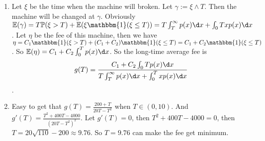\documentclass[../main]{subfiles}
\begin{document}
\begin{solution}
  \begin{enumerate}
    \item Let \(\xi\) be the time when the machine will broken. Let \(\gamma:=\xi \wedge T\).
      Then the machine will be changed at \(\gamma\).
      Obviously \(\mathbb{E}(\gamma)=T \mathbb{P}(\xi>T)+\mathbb{E}(\xi \mathbbm{1}(\xi \leq T))=T \int_{T}^{\infty}p(x) \d x + \int_{0}T xp(x) \d x\).
      Let \(\eta\) be the fee of this machine, then we have \(\eta=C_1\mathbbm{1}(\xi>T)+(C_1+C_2)\mathbbm{1}(\xi \leq T)=C_1+C_2 \mathbbm{1}(\xi \leq T)\).
      So \(\mathbb{E}(\eta)=C_1+C_2 \int_{0}^{T}p(x) \d x\).
      So the long-time average fee is
      \[
        g(T)=\frac{C_1+C_2 \int_{0}T p(x) \d x}{T \int_{T}^{\infty}p(x) \d x + \int_{0}^{T}x p(x) \d x}
      \].
    \item Easy to get that \(g(T)=\frac{200+T}{20T-T^2}\) when \(T \in (0,10)\).
      And \(g'(T)=\frac{T^2 + 400T - 4000}{(20T-T^2)^2}\).
      Let \(g'(T)=0\), then \(T^2+400T-4000=0\), then \(T=20 \sqrt{110}-200 \approx 9.76\).
      So \(T=9.76\) can make the fee get minimum.
  \end{enumerate}
\end{solution}
\end{document}
